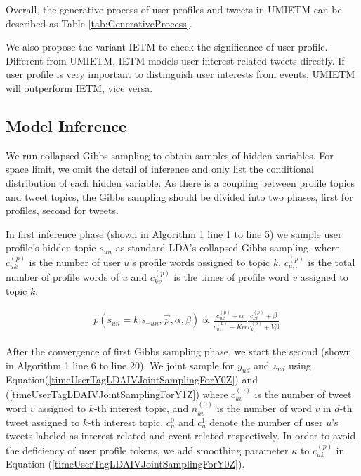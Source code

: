 \documentclass[runningheads,a4paper]{llncs}
\begin{document}
Overall, the generative process of user profiles and tweets in UMIETM can be described as Table \ref{tab:GenerativeProcess}.

We also propose the variant IETM to check the significance of user profile.
Different from UMIETM, IETM models user interest related tweets directly. 
If user profile is very important to distinguish user interests from events, UMIETM will outperform IETM, vice versa.

\subsection{Model Inference}
We run collapsed Gibbs sampling to obtain samples of hidden variables.
For space limit, we omit the detail of inference and only list the conditional distribution of each hidden variable.
As there is a coupling between profile topics and tweet topics, the Gibbs sampling should be divided into two phases, first for profiles, second for tweets.

In first inference phase (shown in Algorithm 1 line 1 to line 5) we sample user profile's hidden topic \(s_{un}\) as standard LDA's collapsed Gibbs sampling\cite{griffiths2004finding}, where \(c^{(p)}_{uk}\) is the number of user \(u\)'s profile words assigned to topic \(k\), \(c^{(p)}_{u,.}\) is the total number of profile words of \(u\) and \(c^{(p)}_{kv}\) is the times of profile word \(v\) assigned to topic \(k\).
\begin{scriptsize}
\begin{equation}
\label{timeUserTagLDAIVsamplingForS}
\begin{aligned}
&p(s_{un}=k|s_{\neg{un}},\vec{p},\alpha,\beta)
\propto \frac{c^{(p)}_{uk}+\alpha}{c^{(p)}_{u,.}+K\alpha}
\frac{c^{(p)}_{kv}+\beta}{c^{(p)}_{k,.}+V\beta}
\end{aligned}
\end{equation}
\end{scriptsize}


After the convergence of first Gibbs sampling phase, we start the second (shown in Algorithm 1 line 6 to line 20).
We joint sample for \(y_{ud}\) and \(z_{ud}\) using Equation(\ref{timeUserTagLDAIVJointSamplingForY0Z}) and (\ref{timeUserTagLDAIVJointSamplingForY1Z}) where \(c^{(0)}_{kv}\) is the number of tweet word \(v\) assigned to \(k\)-th interest topic, and \(n^{(0)}_{kv}\) is the number of word \(v\) in \(d\)-th tweet assigned to \(k\)-th interest topic.
\(c_u^{0}\) and \(c_u^{1}\) denote the number of user \(u\)'s tweets labeled as interest related and event related respectively.
In order to avoid the deficiency of user profile tokens, we add smoothing parameter \(\kappa\) to \(c^{(p)}_{uk}\) in Equation (\ref{timeUserTagLDAIVJointSamplingForY0Z}).
\end{document}
